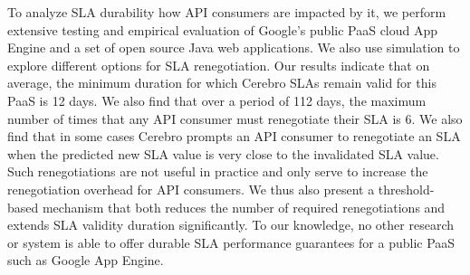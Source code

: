 
To analyze SLA durability how API consumers are 
impacted by it, we perform extensive testing and empirical evaluation
of Google's public PaaS cloud App Engine and a set of open source Java web applications.  
We also use simulation to explore different options for SLA renegotiation.
Our results indicate that on average, the minimum duration for which Cerebro SLAs 
remain valid for this PaaS is 12 days.  We also find that
over a period of 112 days, the maximum number of times that any API consumer must renegotiate
their SLA is 6.  We also find that in some cases Cerebro prompts an API consumer to
renegotiate an SLA when the predicted new SLA value is very close to the invalidated SLA value. 
Such renegotiations are not useful in practice and only serve to increase the renegotiation overhead
for API consumers. We thus also present a threshold-based mechanism that both reduces 
the number of required renegotiations and extends SLA validity duration
significantly.  To our knowledge, no other research or system is able to offer
durable SLA performance guarantees for a public PaaS such as Google App Engine.
